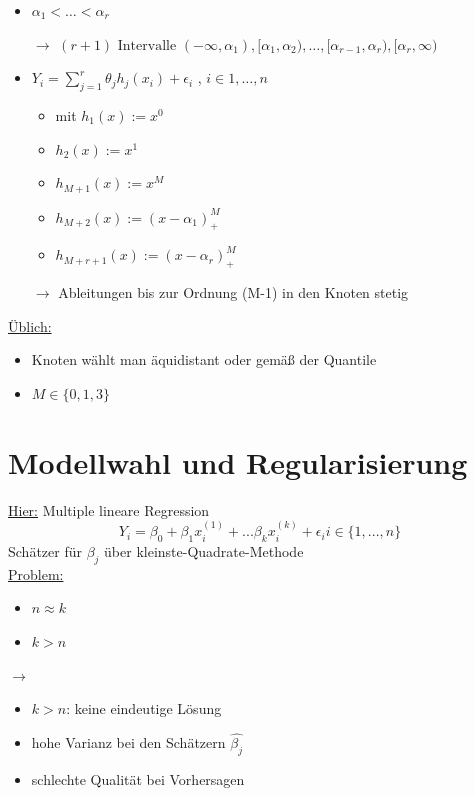 \documentclass[10pt]{report}
\theoremstyle{definition}
\begin{document}
\begin{itemize}
	\item $ \alpha_1 < \ldots < \alpha_r $
	\item[$\rightarrow$] $(r+1) \text{ Intervalle }  (-\infty, \alpha_1),[\alpha_1, \alpha_2) , \ldots, [\alpha_{r-1} , \alpha_r), [\alpha_r, \infty)$
	\item $Y_i  = \sum_{j=1}^{r} \theta_j h_j (x_i) + \epsilon_i$ , $i \in {1,\ldots,n}$
	\item [] 
	\begin{itemize}
		\item mit $h_1(x):=x^0$
		\item $h_2(x) := x^1$
		\item $h_{M+1}(x) := x^{M}$
		\item $h_{M+2}(x) := (x- \alpha_1)^{M}_{+}$
		\item $h_{M+r+1}(x) := (x- \alpha_r)^{M}_{+}$
	\end{itemize} 

\item[$\rightarrow$] Ableitungen bis zur Ordnung (M-1) in den Knoten stetig
\end{itemize}
\underline{Üblich:} 
\begin{itemize}
	\item Knoten wählt man äquidistant oder gemäß der Quantile
	\item $M \in \{0,1,3\}$
\end{itemize}



\chapter{Modellwahl und Regularisierung}
\underline{Hier:} Multiple lineare Regression 
\[ Y_{i} = \beta_{0} + \beta_{1} x_{i}^{(1)} + ... \beta_{k} x_{i}^{(k)} + \epsilon_{i} i \in \{ 1,...,n \} \]
Schätzer für $\beta_{j}$ über kleinste-Quadrate-Methode\\
\underline{Problem:}
\begin{itemize}
 \item $n \approx k$
 \item $k > n$
\end{itemize}
$\rightarrow$ 
\begin{itemize}
 \item $k > n$: keine eindeutige Lösung
 \item hohe Varianz bei den Schätzern $\widehat{\beta_j}$
 \item schlechte Qualität bei Vorhersagen
\end{itemize}
\end{document}
